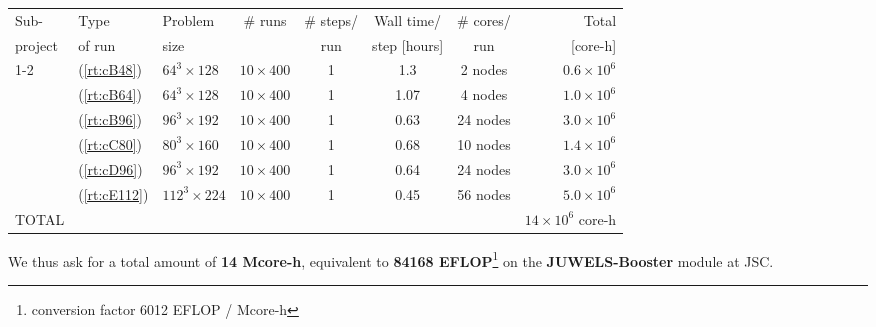 \begin{center}
	{\small
		\begin{tabular}{lllccccr} \hline\hline
			Sub-         &
			Type         &
			Problem      &
			\# runs      &
			\# steps/    &
			Wall time/   &
			\# cores/    &
			Total                                                                                                                \\
			project      &
			of run       &
			size         &
			             &
			run          &
			step [hours] &
			run          &
			[core-h]                                                                                                             \\
			\hline\hline
			1-2          & (\ref{rt:cB48})  & $64^3\times 128$  & $10\times 400$ & 1 & 1.3 & 2 nodes  & $0.6 \times 10^6$       \\
			             & (\ref{rt:cB64})  & $64^3\times 128$  & $10\times 400$ & 1 & 1.07 & 4 nodes  & $1.0 \times 10^6$       \\
			             & (\ref{rt:cB96})  & $96^3\times 192$  & $10\times 400$ & 1 & 0.63 & 24 nodes & $3.0 \times 10^6$       \\
			             & (\ref{rt:cC80})  & $80^3\times 160$  & $10\times 400$ & 1 & 0.68 & 10 nodes & $1.4 \times 10^6$       \\
			             & (\ref{rt:cD96})  & $96^3\times 192$  & $10\times 400$ & 1 & 0.64 & 24 nodes & $3.0 \times 10^6$       \\
						 & (\ref{rt:cE112})  & $112^3\times 224$  & $10\times 400$ & 1 & 0.45 & 56 nodes & $5.0 \times 10^6$       \\
			\hline\hline
			TOTAL        &                  &                   &                &   &      &          & $14\times 10^6$ core-h \\
		\end{tabular}
	}
\end{center}
\bigskip
We thus ask for a total amount of \textbf{14 Mcore-h}, equivalent to \textbf{84168 EFLOP}\footnote{conversion factor 6012 EFLOP / Mcore-h}  on the \textbf{JUWELS-Booster} module at JSC.

